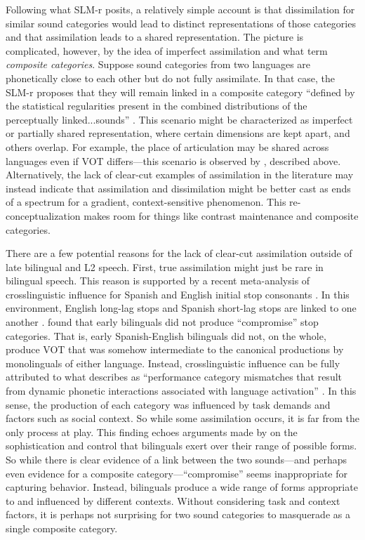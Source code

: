 Following what SLM-r posits, a relatively simple account is that dissimilation for similar sound categories would lead to distinct representations of those categories and that assimilation leads to a shared representation. The picture is complicated, however, by the idea of imperfect assimilation and what \citeauthor{flege_2021_slmr} term \textit{composite categories}. Suppose sound categories from two languages are phonetically close to each other but do not fully assimilate. In that case, the SLM-r proposes that they will remain linked in a composite category ``defined by the statistical regularities present in the combined distributions of the perceptually linked...sounds'' \citep[][p. 41]{flege_2021_slmr}. This scenario might be characterized as imperfect or partially shared representation, where certain dimensions are kept apart, and others overlap. For example, the place of articulation may be shared across languages even if VOT differs---this scenario is observed by \citet{sundara_2006_production}, described above. Alternatively, the lack of clear-cut examples of assimilation in the literature may instead indicate that assimilation and dissimilation might be better cast as ends of a spectrum for a gradient, context-sensitive phenomenon. This re-conceptualization makes room for things like contrast maintenance and composite categories. 

There are a few potential reasons for the lack of clear-cut assimilation outside of late bilingual and L2 speech. First, true assimilation might just be rare in bilingual speech. This reason is supported by a recent meta-analysis of crosslinguistic influence for Spanish and English initial stop consonants \citep{casillas_2021_interlingual}. In this environment, English long-lag stops and Spanish short-lag stops are linked to one another \citep{fricke_2016_phonetic, goldrick_2014_switching, bullock_2009_sociophonetics, olson_2016_transfer}. \citet{casillas_2021_interlingual} found that early bilinguals did not produce ``compromise'' stop categories. That is, early Spanish-English bilinguals did not, on the whole, produce VOT that was somehow intermediate to the canonical productions by monolinguals of either language. Instead, crosslinguistic influence can be fully attributed to what \citeauthor{casillas_2021_interlingual} describes as ``performance category mismatches that result from dynamic phonetic interactions associated with language activation'' \citeyearpar[][p. 16]{casillas_2021_interlingual}. In this sense, the production of each category was influenced by task demands and factors such as social context. So while some assimilation occurs, it is far from the only process at play. This finding echoes arguments made by \citet{bullock_2009_sociophonetics} on the sophistication and control that bilinguals exert over their range of possible forms. So while there is clear evidence of a link between the two sounds---and perhaps even evidence for a composite category---``compromise'' seems inappropriate for capturing behavior. Instead, bilinguals produce a wide range of forms appropriate to and influenced by different contexts. Without considering task and context factors, it is perhaps not surprising for two sound categories to masquerade as a single composite category. 

